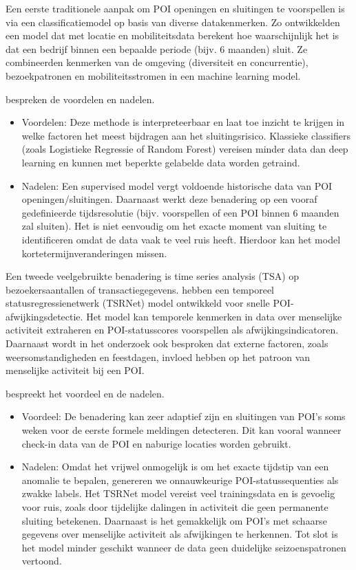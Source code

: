 Een eerste traditionele aanpak om POI openingen en sluitingen te voorspellen is via een classificatiemodel op basis van diverse datakenmerken. Zo ontwikkelden \textcite{DSilva2018} een model dat met locatie en mobiliteitsdata berekent hoe waarschijnlijk het is dat een bedrijf binnen een bepaalde periode (bijv. 6 maanden) sluit. Ze combineerden kenmerken van de omgeving (diversiteit en concurrentie), bezoekpatronen en mobiliteitsstromen in een machine learning model. 

\textcite{DSilva2018} bespreken de voordelen en nadelen.
\begin{itemize}
    \item Voordelen: Deze methode is interpreteerbaar en laat toe inzicht te krijgen in welke factoren het meest bijdragen aan het sluitingsrisico. Klassieke classifiers (zoals Logistieke Regressie of Random Forest) vereisen minder data dan deep learning en kunnen met beperkte gelabelde data worden getraind.
    \item Nadelen: Een supervised model vergt voldoende historische data van POI openingen/sluitingen. Daarnaast werkt deze benadering op een vooraf gedefinieerde tijdsresolutie (bijv. voorspellen of een POI binnen 6 maanden zal sluiten). Het is niet eenvoudig om het exacte moment van sluiting te identificeren omdat de data vaak te veel ruis heeft. Hierdoor kan het model kortetermijnveranderingen missen. 
\end{itemize}

Een tweede veelgebruikte benadering is time series analysis (TSA) op bezoekersaantallen of transactiegegevens. \textcite{Yao2024} hebben een temporeel statusregressienetwerk (TSRNet) model ontwikkeld voor snelle POI-afwijkingsdetectie. Het model kan temporele kenmerken in data over menselijke activiteit extraheren en POI-statusscores voorspellen als afwijkingsindicatoren. Daarnaast wordt in het onderzoek ook besproken dat externe factoren, zoals weersomstandigheden en feestdagen, invloed hebben op het patroon van menselijke activiteit bij een POI. 

\textcite{Yao2024} bespreekt het voordeel en de nadelen.
\begin{itemize}
    \item Voordeel: De benadering kan zeer adaptief zijn en sluitingen van POI's soms weken voor de eerste formele meldingen detecteren. Dit kan vooral wanneer check-in data van de POI en naburige locaties worden gebruikt.
    \item Nadelen: Omdat het vrijwel onmogelijk is om het exacte tijdstip van een anomalie te bepalen, genereren we onnauwkeurige POI-statussequenties als zwakke labels. Het TSRNet model vereist veel trainingsdata en is gevoelig voor ruis, zoals door tijdelijke dalingen in activiteit die geen permanente sluiting betekenen. Daarnaast is het gemakkelijk om POI's met schaarse gegevens over menselijke activiteit als afwijkingen te herkennen. Tot slot is het model minder geschikt wanneer de data geen duidelijke seizoenspatronen vertoond.
\end{itemize}

